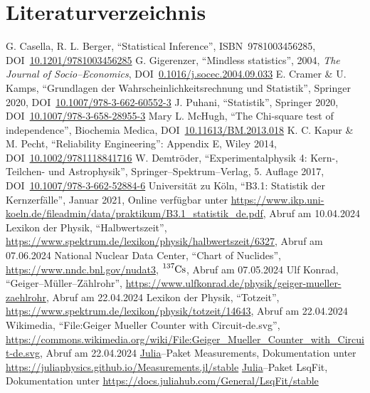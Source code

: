 \documentclass[12pt,a4paper]{scrartcl}
\numberwithin{equation}{section} %
\newcommand{\code}[1]{\textsf{#1}}
\begin{document}
\clearpage
\hypertarget{literatur}{\section{Literaturverzeichnis}\label{literatur}}
\renewcommand{\section}[2]{}

\begin{thebibliography}{99}
	G. Casella, R. L. Berger, ``Statistical Inference'', ISBN~9781003456285,
	DOI~\href{https://doi.org/10.1201/9781003456285}{10.1201/9781003456285}
	G. Gigerenzer, ``Mindless statistics'', 2004, \emph{The Journal of
		Socio--Economics},
		DOI~\href{https://doi.org/10.1016/j.socec.2004.09.033}{0.1016/j.socec.2004.09.033}
	E. Cramer \& U. Kamps, ``Grundlagen der Wahrscheinlichkeitsrechnung
	und Statistik'', Springer 2020, DOI~\href{https://doi.org/10.1007/978-3-662-60552-3}{10.1007/978-3-662-60552-3}
	J. Puhani, ``Statistik'', Springer 2020, DOI~\href{https://doi.org/10.1007/978-3-658-28955-3}{10.1007/978-3-658-28955-3}
	Mary L. McHugh, ``The Chi-square test of independence'', Biochemia Medica, DOI~\href{https://doi.org/10.11613/BM.2013.018}{10.11613/BM.2013.018}
	K. C. Kapur \& M. Pecht, ``Reliability Engineering'': Appendix E,
	Wiley 2014,
	DOI~\href{https://doi.org/10.1002/9781118841716}{10.1002/9781118841716}
	W. Demtröder, ``Experimentalphysik 4: Kern-, Teilchen- und Astrophysik'',
	Springer--Spektrum--Verlag, 5. Auflage 2017, DOI~\href{https://doi.org/10.1007/978-3-662-52884-6}{10.1007/978-3-662-52884-6}
	Universität zu Köln, ``B3.1: Statistik der Kernzerfälle'', Januar
	2021, Online verfügbar unter
	\url{https://www.ikp.uni-koeln.de/fileadmin/data/praktikum/B3.1_statistik_de.pdf}, Abruf am 10.04.2024
	Lexikon der Physik, ``Halbwertszeit'', \url{https://www.spektrum.de/lexikon/physik/halbwertszeit/6327}, Abruf am 07.06.2024
	National Nuclear Data Center, ``Chart of Nuclides'',
	\url{https://www.nndc.bnl.gov/nudat3}, $\ce{^{137}Cs}$,
	Abruf am 07.05.2024
	Ulf Konrad, ``Geiger--Müller--Zählrohr'', \url{https://www.ulfkonrad.de/physik/geiger-mueller-zaehlrohr}, Abruf am 22.04.2024
	Lexikon der Physik, ``Totzeit'', \url{https://www.spektrum.de/lexikon/physik/totzeit/14643}, Abruf am 22.04.2024
	Wikimedia, ``File:Geiger Mueller Counter with Circuit-de.svg'', \url{https://commons.wikimedia.org/wiki/File:Geiger_Mueller_Counter_with_Circuit-de.svg}, Abruf am 22.04.2024
	\code{\href{https://julialang.org}{Julia}}--Paket \code{Measurements}, Dokumentation unter \url{https://juliaphysics.github.io/Measurements.jl/stable}
	\code{\href{https://julialang.org}{Julia}}--Paket \code{LsqFit},
	Dokumentation unter \url{https://docs.juliahub.com/General/LsqFit/stable}
\end{thebibliography}
\end{document}
